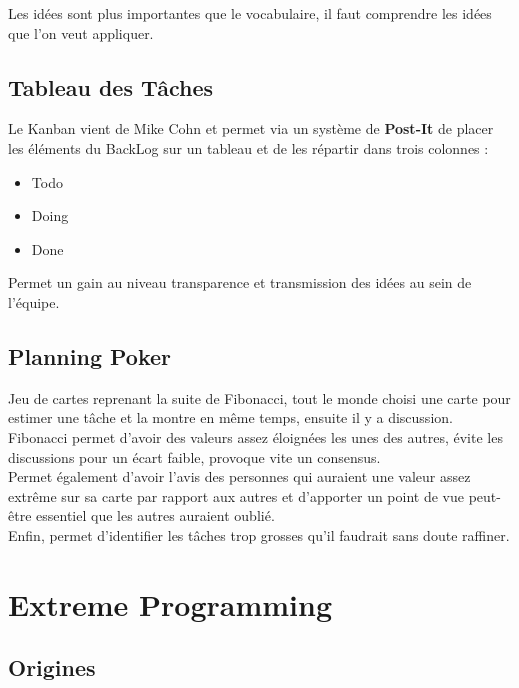 \documentclass{report}
\begin{document}
		Les idées sont plus importantes que le vocabulaire, il faut comprendre les idées que l'on veut appliquer.\\

	\section{Tableau des Tâches}

		Le Kanban vient de Mike Cohn et permet via un système de \textbf{Post-It} de placer les éléments du BackLog sur un tableau et de les répartir dans trois colonnes : \\

		\begin{itemize}
			\item Todo
			\item Doing
			\item Done\\
		\end{itemize}

		Permet un gain au niveau transparence et transmission des idées au sein de l'équipe.\\

	\section{Planning Poker}

		Jeu de cartes reprenant la suite de Fibonacci, tout le monde choisi une carte pour estimer une tâche et la montre en même temps, ensuite il y a discussion.\\

		Fibonacci permet d'avoir des valeurs assez éloignées les unes des autres, évite les discussions pour un écart faible, provoque vite un consensus.\\
		Permet également d'avoir l'avis des personnes qui auraient une valeur assez extrême sur sa carte par rapport aux autres et d'apporter un point de vue peut-être essentiel que les autres auraient oublié.\\

		Enfin, permet d'identifier les tâches trop grosses qu'il faudrait sans doute raffiner.\\

\chapter{Extreme Programming}

	\section{Origines}
\end{document}
